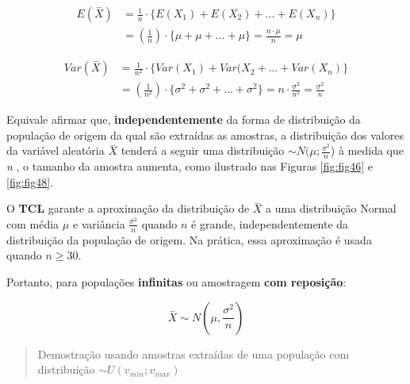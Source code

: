 \documentclass[
]{book}
\begin{document}
\hfill\break

\begin{align*}
E(\stackrel{-}{X})  & = \frac{1}{n} \cdot \{E(X_{1})+E(X_{2})+...+E(X_{n})\} \\
                    & = (\frac{1}{n})\cdot\{\mu+\mu+...+\mu\} = \frac{n\cdot\mu}{n} = \mu 
\end{align*}

\hfill\break

\begin{align*}
Var(\stackrel{-}{X}) & =  \frac{1}{n^{2}} \cdot \{Var(X_{1})+Var(X_{2}+...+Var(X_{n})\} \\
                     & = (\frac{1}{n^{2}}) \cdot \{\sigma^{2}+\sigma^{2}+...+\sigma^{2}\} = n \cdot \frac{\sigma^{2}}{n^{2}} = \frac{\sigma^{2}}{n}
\end{align*}

\hfill\break

Equivale afirmar que, \textbf{independentemente} da forma de distribuição da população de origem da qual são extraídas as amostras, a distribuição dos valores da variável aleatória \(\stackrel{-}{X}\) tenderá a seguir uma distribuição \(\sim N(\mu;\frac{\sigma^{2}}{n}\)) à medida que \emph{n} , o tamanho da amostra aumenta, como ilustrado nas Figuras \ref{fig:fig46} e \ref{fig:fig48}.

\hfill\break

O \textbf{TCL} garante a aproximação da distribuição de \(\stackrel{-}{X}\) a uma distribuição Normal com média \(\mu\) e variância \(\frac{\sigma^{2}}{n}\) quando \(n\) é grande, independentemente da distribuição da população de origem. Na prática, essa aproximação é usada quando \(n\ge 30\).

\hfill\break

Portanto, para populações \textbf{infinitas} ou amostragem \textbf{com reposição}:

\hfill\break

\[
\stackrel{-}{X} \sim N(\mu, \frac{\sigma^{2}}{n})
\]

\hfill\break

\begin{quote}
Demostração usando amostras extraídas de uma população com distribuição \(\sim U (v_{min}; v_{max})\)
\end{quote}

\hfill\break
\end{document}
